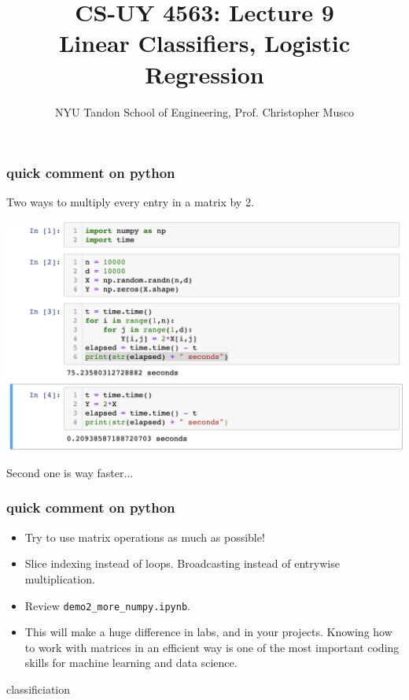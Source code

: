 \documentclass[handout,compress]{beamer}
\title{CS-UY 4563: Lecture 9 \\ Linear Classifiers, Logistic Regression}
\author{NYU Tandon School of Engineering, Prof. Christopher Musco}
\date{}
\begin{document}
\begin{frame}
	\titlepage 
\end{frame}

\begin{frame}
	\frametitle{quick comment on python}
	\begin{center}
		Two ways to multiply every entry in a matrix by 2. 
		
		\includegraphics*[width=.9\textwidth]{slow_python.png}
		
		Second one is way faster...
	\end{center}
\end{frame}

\begin{frame}
	\frametitle{quick comment on python}
	\begin{itemize}
		\item Try to use matrix operations as much as possible!
		\item Slice indexing instead of loops. Broadcasting instead of entrywise multiplication.
		\item Review \texttt{demo2\_more\_numpy.ipynb}.
		\item This will make a huge difference in labs, and in your projects. Knowing how to work with matrices in an efficient way is one of the most important coding skills for machine learning and data science.
	\end{itemize}
\end{frame}

\begin{frame}[standout]
	classificiation
\end{frame}
\end{document}
